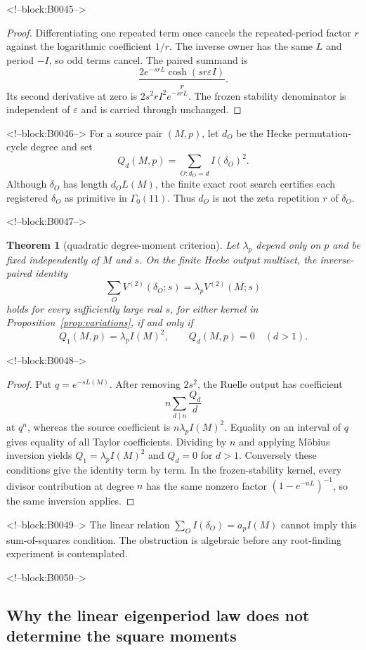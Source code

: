 \documentclass[11pt]{article}
\newtheorem{theorem}{Theorem}[section]
\theoremstyle{definition}
\theoremstyle{remark}
\newcommand{\G}{\Gamma_0(11)}
\newcommand{\e}{\varepsilon}
\begin{document}
<!--block:B0045-->
\begin{proof}
Differentiating one repeated term once cancels the repeated-period factor $r$ against the logarithmic coefficient $1/r$. The inverse owner has the same $L$ and period $-I$, so odd terms cancel. The paired summand is
\[
\frac{2e^{-srL}\cosh(sr\e I)}r.
\]
Its second derivative at zero is $2s^2rI^2e^{-srL}$. The frozen stability denominator is independent of $\e$ and is carried through unchanged.
\end{proof}

<!--block:B0046-->
For a source pair $(M,p)$, let $d_O$ be the Hecke permutation-cycle degree and set
\[
Q_d(M,p)=\sum_{O:d_O=d} I(\delta_O)^2.
\]
Although $\delta_O$ has length $d_OL(M)$, the finite exact root search certifies each registered $\delta_O$ as primitive in $\G$. Thus $d_O$ is not the zeta repetition $r$ of $\delta_O$.

<!--block:B0047-->
\begin{theorem}[quadratic degree-moment criterion]\label{thm:moment}
Let $\lambda_p$ depend only on $p$ and be fixed independently of $M$ and $s$. On the finite Hecke output multiset, the inverse-paired identity
\[
\sum_O V^{(2)}(\delta_O;s)=\lambda_pV^{(2)}(M;s)
\]
holds for every sufficiently large real $s$, for either kernel in Proposition~\ref{prop:variations}, if and only if
\[
Q_1(M,p)=\lambda_p I(M)^2,
\qquad
Q_d(M,p)=0\quad(d>1).
\]
\end{theorem}

<!--block:B0048-->
\begin{proof}
Put $q=e^{-sL(M)}$. After removing $2s^2$, the Ruelle output has coefficient
\[
n\sum_{d\mid n}\frac{Q_d}{d}
\]
at $q^n$, whereas the source coefficient is $n\lambda_pI(M)^2$. Equality on an interval of $q$ gives equality of all Taylor coefficients. Dividing by $n$ and applying M\"obius inversion yields $Q_1=\lambda_pI(M)^2$ and $Q_d=0$ for $d>1$. Conversely these conditions give the identity term by term. In the frozen-stability kernel, every divisor contribution at degree $n$ has the same nonzero factor $(1-e^{-nL})^{-1}$, so the same inversion applies.
\end{proof}

<!--block:B0049-->
The linear relation $\sum_OI(\delta_O)=a_pI(M)$ cannot imply this sum-of-squares condition. The obstruction is algebraic before any root-finding experiment is contemplated.

<!--block:B0050-->
\subsection{Why the linear eigenperiod law does not determine the square moments}
\end{document}
